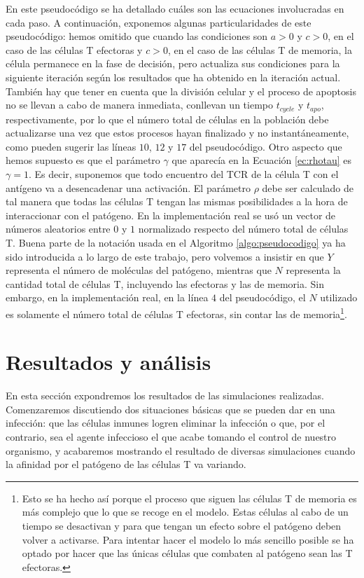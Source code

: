 En este pseudocódigo se ha detallado cuáles son las ecuaciones involucradas en cada paso. A continuación, exponemos algunas particularidades de este pseudocódigo: hemos omitido que cuando las condiciones son $a > 0$ y $c > 0$, en el caso de las células T efectoras y $c > 0$, en el caso de las células T de memoria, la célula permanece en la fase de decisión, pero actualiza sus condiciones para la siguiente iteración según los resultados que ha obtenido en la iteración actual. También hay que tener en cuenta que la división celular y el proceso de apoptosis no se llevan a cabo de manera inmediata, conllevan un tiempo $t_{cycle}$ y $t_{apo}$, respectivamente, por lo que el número total de células en la población debe actualizarse una vez que estos procesos hayan finalizado y no instantáneamente, como pueden sugerir las líneas $10$, $12$ y $17$ del pseudocódigo. Otro aspecto que hemos supuesto es que el parámetro $\gamma$ que aparecía en la Ecuación \ref{ec:rhotau} es $\gamma = 1$. Es decir, suponemos que todo encuentro del TCR de la célula T con el antígeno va a desencadenar una activación. El parámetro $\rho$ debe ser calculado de tal manera que todas las células T tengan las mismas posibilidades a la hora de interaccionar con el patógeno. En la implementación real se usó un vector de números aleatorios entre $0$ y $1$ normalizado respecto del número total de células T. Buena parte de la notación usada en el Algoritmo \ref{algo:pseudocodigo} ya ha sido introducida a lo largo de este trabajo, pero volvemos a insistir en que $Y$ representa el número de moléculas del patógeno, mientras que $N$ representa la cantidad total de células T, incluyendo las efectoras y las de memoria. Sin embargo, en la implementación real, en la línea $4$ del pseudocódigo, el $N$ utilizado es solamente el número total de células T efectoras, sin contar las de memoria\footnote{Esto se ha hecho así porque el proceso que siguen las células T de memoria es más complejo que lo que se recoge en el modelo. Estas células al cabo de un tiempo se desactivan y para que tengan un efecto sobre el patógeno deben volver a activarse. Para intentar hacer el modelo lo más sencillo posible se ha optado por hacer que las únicas células que combaten al patógeno sean las T efectoras.}.


\section{Resultados y análisis}
\label{sec:simulacionesMicro}

En esta sección expondremos los resultados de las simulaciones realizadas. Comenzaremos discutiendo dos situaciones básicas que se pueden dar en una infección: que las células inmunes logren eliminar la infección o que, por el contrario, sea el agente infeccioso el que acabe tomando el control de nuestro organismo, y acabaremos mostrando el resultado de diversas simulaciones cuando la afinidad por el patógeno de las células T va variando.

